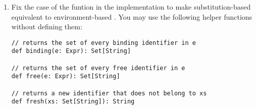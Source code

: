 \begin{exercise}
\begin{enumerate}
  \item Fix the  case of the funtion  in the
    implementation to make substitution-based \Lang equivalent to
    environment-based \Lang.  You may use the following helper functions
    without defining them:

\begin{verbatim}
// returns the set of every binding identifier in e
def binding(e: Expr): Set[String]

// returns the set of every free identifier in e
def free(e: Expr): Set[String]

// returns a new identifier that does not belong to xs
def fresh(xs: Set[String]): String
\end{verbatim}

\end{enumerate}

\end{exercise}

